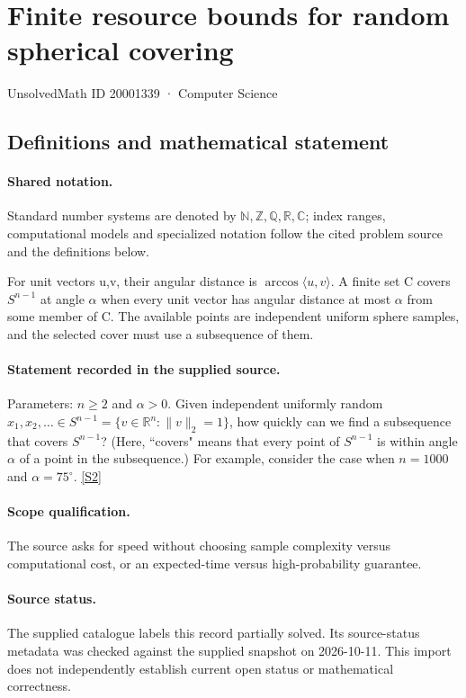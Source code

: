 \documentclass[11pt]{article}
\newcommand{\sref}[2]{\hyperlink{source:#1:#2}{[S#2]}}
\begin{document}
\setcounter{section}{20001338}
\section{Finite resource bounds for random spherical covering}\label{20001339}
{\small\sffamily UnsolvedMath ID 20001339 · Computer Science}
\subsection{Definitions and mathematical statement}

\paragraph{Shared notation.}Standard number systems are denoted by $\mathbb N,\mathbb Z,\mathbb Q,\mathbb R,\mathbb C$; index ranges, computational models and specialized notation follow the cited problem source and the definitions below.


For unit vectors u,v, their angular distance is $\arccos\langle u,v\rangle$. A finite set C covers $S^{n-1}$ at angle $\alpha$ when every unit vector has angular distance at most $\alpha$ from some member of C. The available points are independent uniform sphere samples, and the selected cover must use a subsequence of them.
\paragraph{Statement recorded in the supplied source.}
Parameters: $n \geq 2$ and $\alpha > 0$. Given independent uniformly random $x_1, x_2, \dots\in S^{n-1} = \{v \in \mathbb R^n : \|v\|_2 = 1\}$, how quickly can we find a subsequence that covers $S^{n-1}$? (Here, ``covers" means that every point of $S^{n-1}$ is within angle $\alpha$ of a point in the subsequence.) For example, consider the case when $n = 1000$ and $\alpha = 75^\circ$. \sref{20001339}{2}
\paragraph{Scope qualification.}
The source asks for speed without choosing sample complexity versus computational cost, or an expected-time versus high-probability guarantee.
\paragraph{Source status.}
The supplied catalogue labels this record partially solved. Its source-status metadata was checked against the supplied snapshot on 2026-10-11. This import does not independently establish current open status or mathematical correctness.
\end{document}
